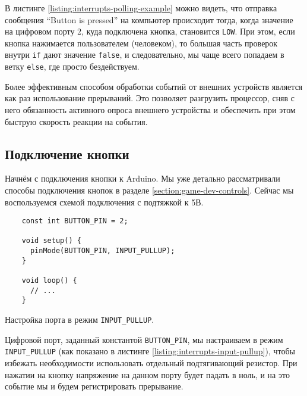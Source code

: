 \documentclass[../sparc.tex]{subfiles}
\begin{document}
В листинге \ref{listing:interrupts-polling-example} можно видеть, что отправка
сообщения ``Button is pressed'' на компьютер происходит тогда, когда значение на
цифровом порту 2, куда подключена кнопка, становится \texttt{LOW}.  При
этом, если кнопка нажимается пользователем (человеком), то большая часть
проверок внутри \texttt{if} дают значение \texttt{false}, и
следовательно, мы чаще всего попадаем в ветку \texttt{else}, где просто
бездействуем.

Более эффективным способом обработки событий от внешних устройств является как
раз использование прерываний.  Это позволяет разгрузить процессор, сняв с него
обязанность активного опроса внешнего устройства и обеспечить при этом быструю
скорость реакции на события.

\subsection{Подключение кнопки}
\label{section:interrupts-button}

Начнём с подключения кнопки к Arduino.  Мы уже детально рассматривали способы
подключения кнопок в разделе \ref{section:game-dev-controls}.  Сейчас мы
воспользуемся схемой подключения с подтяжкой к 5В.


\begin{listing}[H]
  \begin{verbatim}
    const int BUTTON_PIN = 2;

    void setup() {
      pinMode(BUTTON_PIN, INPUT_PULLUP);
    }

    void loop() {
      // ...
    }
  \end{verbatim}
  \caption{Настройка порта в режим \texttt{INPUT_PULLUP}.}
  \label{listing:interrupts-input-pullup}
\end{listing}

Цифровой порт, заданный константой \texttt{BUTTON_PIN}, мы настраиваем
в режим \texttt{INPUT_PULLUP} (как показано в листинге
\ref{listing:interrupts-input-pullup}), чтобы избежать необходимости
использовать отдельный подтягивающий резистор.  При нажатии на кнопку напряжение
на данном порту будет падать в ноль, и на это событие мы и будем регистрировать
прерывание.

\end{document}
